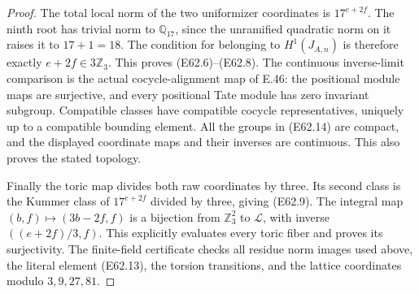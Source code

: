 \begin{proof}
The total local norm of the two
uniformizer coordinates is
$17^{e+2f}$.
The ninth root has trivial norm
to $\mathbb Q_{17}$, since the
unramified quadratic norm on it
raises it to $17+1=18$.
The condition for belonging to
$H^1(J_{A,n})$ is therefore exactly
$e+2f\in3\mathbb Z_3$.
This proves (E62.6)--(E62.8).
The continuous inverse-limit
comparison is the actual
cocycle-alignment map of E.46:
the positional module maps are
surjective, and every positional
Tate module has zero invariant
subgroup. Compatible classes have
compatible cocycle representatives,
uniquely up to a compatible
bounding element. All the groups
in (E62.14) are compact, and the
displayed coordinate maps and
their inverses are continuous.
This also proves the stated topology.

Finally the toric map divides both
raw coordinates by three.
Its second class is the Kummer
class of $17^{e+2f}$ divided by
three, giving (E62.9).
The integral map
$(b,f)\mapsto(3b-2f,f)$ is a
bijection from $\mathbb Z_3^2$
to $\mathcal L$, with inverse
$((e+2f)/3,f)$.
This explicitly evaluates every
toric fiber and proves its
surjectivity. The finite-field
certificate checks all residue
norm images used above, the
literal element (E62.13), the
torsion transitions, and the
lattice coordinates modulo
$3,9,27,81$.
\end{proof}
